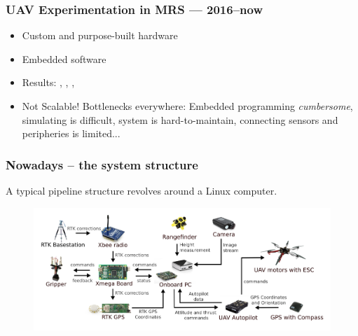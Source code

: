 \documentclass[aspectratio=1610]{beamer}
\begin{document}
  \begin{frame}
    \frametitle{UAV Experimentation in MRS --- 2016--now}

    \begin{itemize}
      \item Custom and purpose-built hardware
      \item Embedded software
      \item Results: \cite{baca2016embedded}, \cite{spurny2016complex}, \cite{saska2016auro}, \cite{chudoba2016exploration}
      \item {\color{red} Not Scalable! Bottlenecks everywhere: Embedded programming \emph{cumbersome}, simulating is difficult, system is hard-to-maintain, connecting sensors and peripheries is limited...}
    \end{itemize}

  \end{frame}


  \begin{frame}
    \frametitle{Nowadays -- the system structure}

    \begin{block}{A typical pipeline structure revolves around a Linux computer.}
      \begin{figure}
        \includegraphics[width=1.0\textwidth]{fig/components.png}
      \end{figure}
    \end{block}

  \end{frame}

\end{document}
